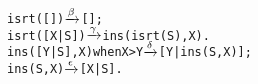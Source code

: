 \begin{alltt}
isrt(   [])             \(\smashedrightarrow{\beta}\) [];
isrt([X|S])             \(\smashedrightarrow{\gamma}\) ins(isrt(S),X).
ins([Y|S],X) when X > Y \(\smashedrightarrow{\delta}\) [Y|ins(S,X)];
ins(    S,X)            \(\smashedrightarrow{\epsilon}\) [X|S].
\end{alltt}
